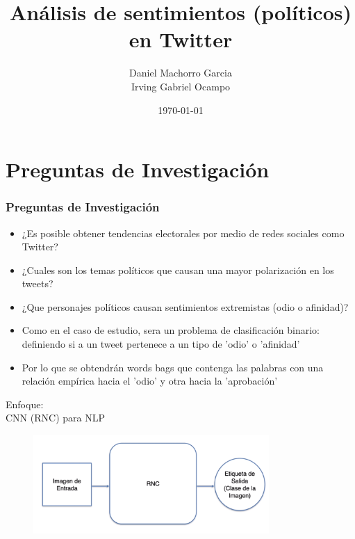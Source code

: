 \documentclass{beamer}
\title{Análisis de sentimientos (políticos) en Twitter}
\author{Daniel Machorro Garcia \\ Irving Gabriel Ocampo}
\institute{Universidad Nacional Autonoma de México}
\date{\today}
\begin{document}
\frame{\titlepage}

\AtBeginSection[]
{
    \begin{frame}
        \tableofcontents[currentsection]
    \end{frame}
}


\section{Preguntas de Investigación}
\begin{frame}
    \frametitle{Preguntas de Investigación}
    \begin{itemize}
        \item ¿Es posible obtener tendencias electorales por medio de redes sociales como Twitter?
        \pause
        \vspace{0.5cm}
        \item ¿Cuales son los temas políticos que causan una mayor polarización en los tweets?
        \pause
        \vspace{0.5cm}
        \item ¿Que personajes políticos causan sentimientos extremistas (odio o afinidad)?
    \end{itemize}
\end{frame}

\begin{frame}
    
    \begin{itemize}

        \item Como en el caso de estudio, sera un problema de clasificación binario: definiendo si a un tweet pertenece a un tipo de 'odio' o 'afinidad'
        \pause
        \vspace{0.5cm}
        \item Por lo que se obtendrán words bags que contenga las palabras con una relación empírica hacia el 'odio' y otra hacia la 'aprobación'
        
    \end{itemize}
\end{frame}

\begin{frame}
    Enfoque:\\
    \centering
        CNN (RNC) para NLP 
        \vspace{0.5cm}
        \begin{figure}
            \includegraphics[width=0.8\textwidth]{img/Akwtp537HU.png}
        \end{figure}
\end{frame}
\end{document}
